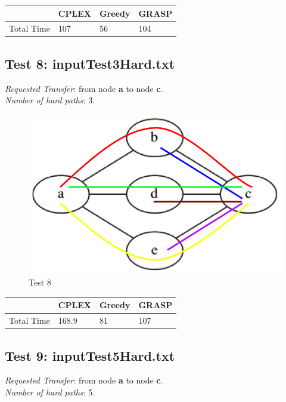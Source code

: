 \documentclass[11pt,a4paper]{article}
\begin{document}
\begin{tabular}{| l | l | l | l |}
\hline
 & CPLEX & Greedy & GRASP \\ \hline
Total Time & 107 & 56 & 104 \\ \hline
\end{tabular}

\subsection{Test 8: inputTest3Hard.txt}

\textit{Requested Transfer}: from node \textbf{a} to node \textbf{c}.\\
\textit{Number of hard paths}: 3.\\

\begin{figure}[H]
  \centering
    \includegraphics[scale=0.7]{inputTest3Hard.png}
  \caption{Test 8}
  \label{fig:test8}
\end{figure}

\begin{tabular}{| l | l | l | l |}
\hline
 & CPLEX & Greedy & GRASP \\ \hline
Total Time & 168.9 & 81 & 107 \\ \hline
\end{tabular}

\subsection{Test 9: inputTest5Hard.txt}

\textit{Requested Transfer}: from node \textbf{a} to node \textbf{c}.\\
\textit{Number of hard paths}: 5.\\
\end{document}
